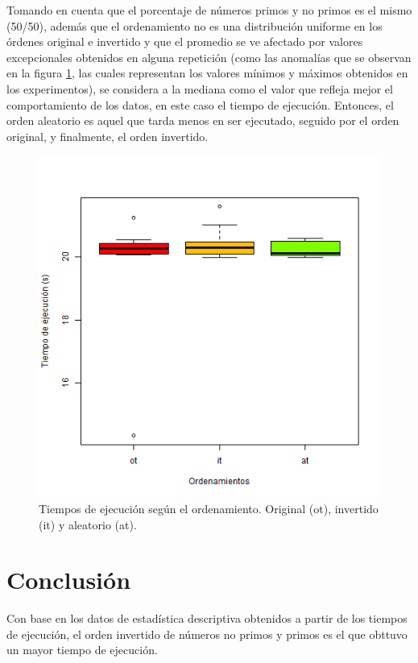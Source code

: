 \documentclass{article}
\begin{document}
Tomando en cuenta que el porcentaje de números primos y no primos es el mismo (50/50), además que el ordenamiento no es una distribución uniforme en los órdenes original e invertido y que el promedio se ve afectado por valores excepcionales obtenidos en alguna repetición (como las anomalías que se observan en la figura \ref{figura1}, las cuales representan los valores mínimos y máximos obtenidos en los experimentos), se considera a la mediana como el valor que refleja mejor el comportamiento de los datos, en este caso el tiempo de ejecución. Entonces, el orden aleatorio es aquel que tarda menos en ser ejecutado, seguido por el orden original, y finalmente, el orden invertido.
\begin{figure}[ptb]
\begin{center}
\includegraphics[width=\linewidth]{p3.png}
\end{center}
\caption{Tiempos de ejecución según el ordenamiento. Original (ot), invertido (it) y aleatorio (at).\label{figura1}}
\end{figure}

\section{Conclusión}
Con base en los datos de estadística descriptiva obtenidos a partir de los tiempos de ejecución, el orden invertido de números no primos y primos es el que obttuvo un mayor tiempo de ejecución. 



\end{document}
